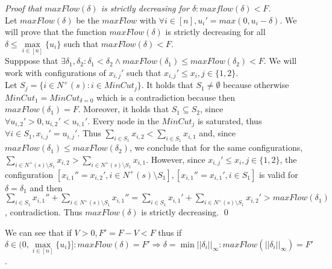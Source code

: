 \documentclass[11pt]{llncs}
\begin{document}
    \begin{proof}[Proof that $maxFlow(\delta)$ is strictly decreasing for $\delta: maxflow(\delta) < F$] \ \\
       Let $maxFlow(\delta)$ be the $maxFlow$ with $\forall i \in [n], u_i' = max(0, u_i - \delta)$.
       We will prove that the function $maxFlow(\delta)$ is strictly decreasing for all $\delta \leq \max\limits_{i \in
       [n]}\{u_i\}$ such that $maxFlow(\delta) < F$. \\
       Supppose that $\exists \delta_1, \delta_2 : \delta_1 < \delta_2 \wedge maxFlow(\delta_1) \leq maxFlow(\delta_2) < F$.
       We will work with configurations of $x_{i,j}'$ such that $x_{i,j}' \leq x_i, j \in \{1,2\}$. \\
       Let $S_j = \{i \in N^{+}(s) : i \in MinCut_j\}$. It holds that $S_1 \neq \emptyset$ because otherwise $MinCut_1 =
       MinCut_{\delta = 0}$ which is a contradiction because then $maxFlow(\delta_1) = F$. Moreover, it holds that
       $S_1 \subseteq S_2$, since $\forall u_{i,2}' > 0,u_{i,2}' < u_{i,1}'$. Every node in the $MinCut_j$ is saturated, thus
       $\forall i \in S_1, x_{i,j}' = u_{i,j}'$. Thus $\sum\limits_{i \in S_1} x_{i,2} < \sum\limits_{i \in S_1}x_{i,1}$ and,
       since $maxFlow(\delta_1) \leq maxFlow(\delta_2)$, we conclude that for the same configurations,
       $\sum\limits_{i \in N^{+}(s) \setminus S_1} x_{i,2} > \sum\limits_{i \in N^{+}(s) \setminus S_1}x_{i,1}$.
       However, since $x_{i,j}' \leq x_i, j \in \{1,2\}$, the configuration
       $[x_{i,1}'' = x_{i,2}', i \in N^{+}(s) \setminus S_1], [x_{i,1}'' = x_{i,1}', i \in S_1]$ is valid for
       $\delta = \delta_1$ and then $\sum\limits_{i \in S_1}x_{i,1}'' + \sum\limits_{i \in N^{+}(s) \setminus S_1}x_{i,1}'' =
       \sum\limits_{i \in S_1}x_{i,1}' + \sum\limits_{i \in N^{+}(s) \setminus S_1}x_{i,2}' > maxFlow(\delta_1)$,
       contradiction. Thus $maxFlow(\delta)$ is strictly decreasing. \qed
    \end{proof}
       We can see that if $V > 0, F' = F - V < F$ thus if $\delta \in (0, \max\limits_{i \in [n]}\{u_i\}]:
       maxFlow(\delta)= F' \Rightarrow \delta = \min||\delta_i||_\infty : maxFlow(||\delta_i||_\infty) = F'$.
\end{document}
